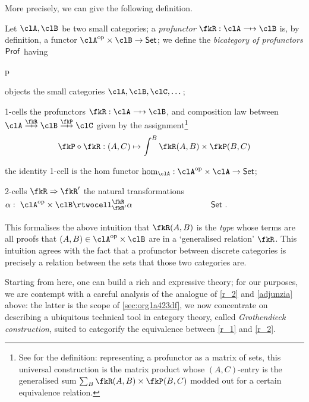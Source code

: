 More precisely, we can give the following definition.
\begin{definition}[Profunctor]\label{def_profu}
  Let $\clA,\clB$ be two small categories; a \emph{profunctor} $\fkR : \clA \pto \clB$ is, by definition, a functor $\clA^\op\times\clB \to \Set$; we define the \emph{bicategory of profunctors} $\mathsf{Prof}$ having
  \begin{enumtag}{p}
    \item objects the small categories $\clA,\clB,\clC,\dots$;
    \item 1-cells the profunctors $\fkR : \clA \pto \clB$, and composition law between $\clA \overset{\fkR}{\pto} \clB \overset{\fkP}{\pto} \clC$ given by the assignment\footnote{See \cite[6.2.10]{Bor2} for the definition: representing a profunctor as a matrix of sets, this universal construction is the matrix product whose $(A,C)$-entry is the generalised sum $\sum_B \fkR(A,B)\times\fkP(B,C)$ modded out for a certain equivalence relation.}
    \[ \fkP\diamond \fkR : (A,C)\mapsto \int^B \fkR(A,B)\times\fkP(B,C) \]
    \item the identity 1-cell is the hom functor $\hom_\clA : \clA^\op\times\clA \to \Set$;
    \item 2-cells $\fkR\To\fkR'$ the natural transformations $\alpha : \xymatrix{**[l] \clA^\op\times\clB \rtwocell^{\fkR}_{\fkR'}{\alpha}& **[r] \Set}$.
  \end{enumtag}
\end{definition}
This formalises the above intuition that $\fkR(A,B)$ is the \emph{type} whose terms are all proofs that $(A,B)\in\clA^\op\times\clB$ are in a  `generalised relation' $\fkR$. This intuition agrees with the fact that a profunctor between discrete categories is precisely a relation between the sets that those two categories are.

Starting from here, one can build a rich and expressive theory; for our purposes, we are contempt with a careful analysis of the analogue of \ref{r_2} and \eqref{adjunzia} above: the latter is the scope of \autoref{sec:org1a423df}, we now concentrate on describing a ubiquitous technical tool in category theory, called \emph{Gro\-then\-dieck construction}, suited to categorify the equivalence between \ref{r_1} and \ref{r_2}.

